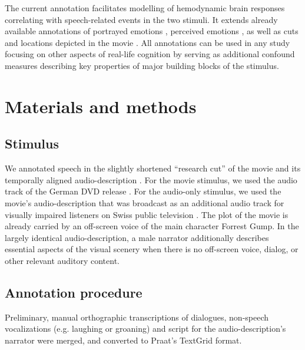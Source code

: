 \documentclass[10pt,a4paper,onecolumn]{article}
\begin{document}
The current annotation facilitates modelling of hemodynamic brain responses
correlating with speech-related events in the two stimuli.
It extends already available annotations of portrayed emotions \citep{labs2015portrayed}, perceived emotions \citep{lettieri2019emotionotopy}, as well as cuts and locations depicted in the movie \citep{haeusler2016annotation}.
All annotations can be used in any study focusing on other aspects of real-life cognition by serving as additional confound measures describing key properties of major building blocks of the stimulus.

\section*{Materials and methods}
\subsection*{Stimulus}
We annotated speech in the slightly shortened ``research cut'' of the movie \citep{hanke2016simultaneous} and its temporally aligned audio-description \citep{hanke2014audiomovie}.
For the movie stimulus, we used the audio track of the German DVD release \citep{ForrestGumpDVD}.
For the audio-only stimulus, we used the movie's audio-description that was broadcast as an additional audio track for visually impaired listeners on Swiss public television \citep{ForrestGumpGermanAD}.
The plot of the movie is already carried by an off-screen voice of the main character Forrest Gump.
In the largely identical audio-description, a male narrator additionally describes essential aspects of the visual scenery when there is no off-screen voice, dialog, or other relevant auditory content.

\subsection*{Annotation procedure}
Preliminary, manual orthographic transcriptions of dialogues, non-speech vocalizations (e.g. laughing or groaning) and script for the audio-description's narrator were merged, and converted to Praat's \citep{boersma2019praat} TextGrid format.
\end{document}
